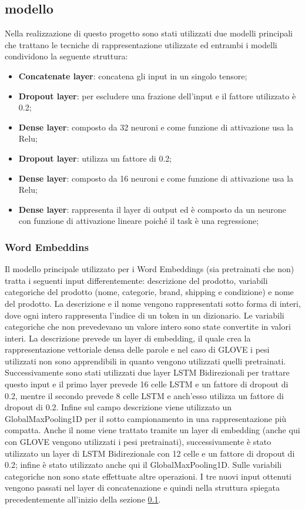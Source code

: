 \subsection{modello}\label{Modello}
Nella realizzazione di questo progetto sono stati utilizzati due modelli
principali che trattano le tecniche di rappresentazione utilizzate ed  entrambi
i modelli condividono la seguente struttura:
\begin{itemize}
	\item \textbf{Concatenate layer}: concatena gli input in un singolo tensore;
	\item \textbf{Dropout layer}: per escludere una frazione dell'input e il fattore utilizzato è 0.2;
	\item \textbf{Dense layer}: composto da 32 neuroni e come funzione di attivazione usa la Relu;
	\item \textbf{Dropout layer}: utilizza un fattore di 0.2;
	\item \textbf{Dense layer}: composto da 16 neuroni e come funzione di attivazione usa la Relu;
	\item \textbf{Dense layer}: rappresenta il layer di output ed è composto da un neurone con funzione di attivazione lineare poiché il task è una regressione;
\end{itemize}
\subsubsection{Word Embeddins}
Il modello principale utilizzato per i Word Embeddings (sia pretrainati che non)
tratta i seguenti input differentemente: descrizione del prodotto, variabili
categoriche del prodotto (nome, categorie, brand, shipping e condizione) e nome
del prodotto.
La descrizione e il nome vengono rappresentati sotto forma di interi, dove ogni
intero rappresenta l'indice di un token in un dizionario.
Le variabili categoriche che non prevedevano un valore intero sono state
convertite in valori interi.
La descrizione prevede un layer di embedding, il quale crea la rappresentazione
vettoriale densa delle parole e nel caso di GLOVE i pesi utilizzati non sono
apprendibili in quanto vengono utilizzati quelli pretrainati.
Successivamente sono stati utilizzati due layer LSTM Bidirezionali per trattare
questo input e il primo layer prevede 16 celle LSTM e un fattore di dropout di
0.2, mentre il secondo prevede 8 celle LSTM e anch'esso utilizza un fattore di
dropout di 0.2.
Infine sul campo descrizione viene utilizzato un GlobalMaxPooling1D per il sotto
campionamento in una rappresentazione più compatta.
Anche il nome viene trattato tramite un layer di embedding (anche qui con GLOVE
vengono utilizzati i pesi pretrainati), successivamente è stato utilizzato un
layer di LSTM Bidirezionale con 12 celle e un fattore di dropout di 0.2; infine
è stato utilizzato anche qui il GlobalMaxPooling1D.
Sulle variabili categoriche non sono state effettuate altre operazioni.
I tre nuovi input ottenuti vengono passati nel layer di concatenazione e quindi
nella struttura spiegata precedentemente all'inizio della sezione \ref{Modello}.

